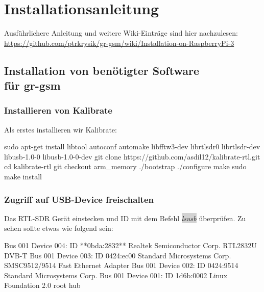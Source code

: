 
\chapter{Installationsanleitung}\label{Install}

Ausführlichere Anleitung und weitere Wiki-Einträge sind hier nachzulesen:\\
\url{https://github.com/ptrkrysik/gr-gsm/wiki/Installation-on-RaspberryPi-3}


\section[Installation von benötigter Software für gr-gsm]{Installation von benötigter Software \\ für gr-gsm}

\subsection{Installieren von Kalibrate}

%
%

Als erstes installieren wir Kalibrate:

\begin{code}[	numbers=left,stepnumber=1]
sudo apt-get install libtool autoconf automake libfftw3-dev librtlsdr0 librtlsdr-dev libusb-1.0-0 libusb-1.0-0-dev
git clone https://github.com/asdil12/kalibrate-rtl.git
cd kalibrate-rtl
git checkout arm_memory
./bootstrap
./configure
make
sudo make install 
\end{code}

\subsection{Zugriff auf USB-Device freischalten}

Das RTL-SDR Gerät einstecken und ID mit dem Befehl \colorbox{lightgray}{\emph{lsusb}} überprüfen. Zu sehen sollte etwas wie folgend sein:

\begin{code}
Bus 001 Device 004: ID **0bda:2832** Realtek Semiconductor Corp. RTL2832U DVB-T
Bus 001 Device 003: ID 0424:ec00 Standard Microsystems Corp. SMSC9512/9514 Fast Ethernet Adapter
Bus 001 Device 002: ID 0424:9514 Standard Microsystems Corp.
Bus 001 Device 001: ID 1d6b:0002 Linux Foundation 2.0 root hub
\end{code}


